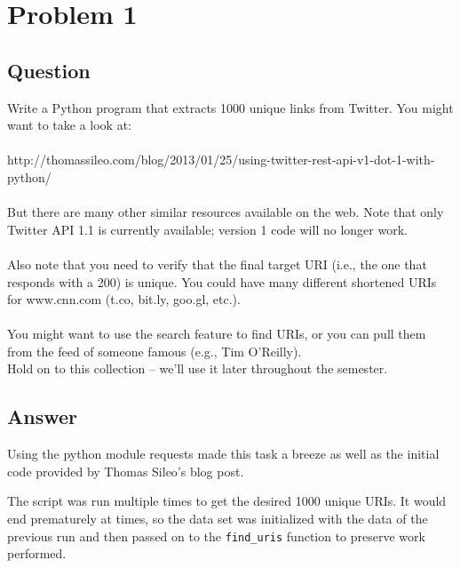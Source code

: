 \section{Problem 1}

\subsection{Question}
\vspace*{10pt}
Write a Python program that extracts 1000 unique links from
Twitter.  You might want to take a look at:\\
\\
http://thomassileo.com/blog/2013/01/25/using-twitter-rest-api-v1-dot-1-with-python/\\
\\
But there are many other similar resources available on the web.  Note
that only Twitter API 1.1 is currently available; version 1 code will
no longer work.\\
\\
Also note that you need to verify that the final target URI (i.e., the
one that responds with a 200) is unique.  You could have many different
shortened URIs for www.cnn.com (t.co, bit.ly, goo.gl, etc.).\\
\\
You might want to use the search feature to find URIs, or you can
pull them from the feed of someone famous (e.g., Tim O'Reilly).\\
Hold on to this collection -- we'll use it later throughout the semester.

\subsection{Answer}
\vspace{5mm}
Using the python module requests made this task a breeze as well as the initial code provided by Thomas Sileo's blog post.
\vspace{2mm}

\vspace{1mm}
The script was run multiple times to get the desired 1000 unique URIs. It would end prematurely at times, so the data set was initialized with the data of the previous run and then passed on to the {\tt find\_uris} function to preserve work performed.
\vspace{5mm}

